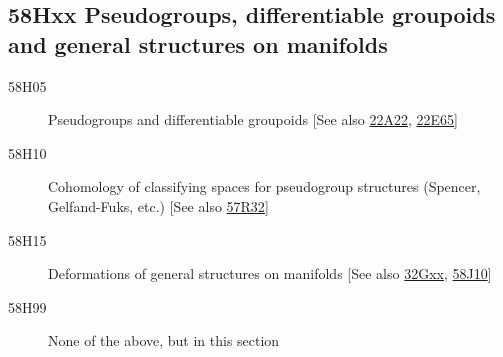 \documentclass[letterpaper]{article}
\begin{document}
\subsection*{58Hxx  Pseudogroups, differentiable groupoids and general structures on manifolds }\label{58Hxx}
\begin{description}  
\item [58H05]\label{58H05} Pseudogroups and differentiable groupoids [See also \hyperref[22A22]{22A22}, \hyperref[22E65]{22E65}]
\item [58H10]\label{58H10} Cohomology of classifying spaces for pseudogroup structures (Spencer, Gelfand-Fuks, etc.) [See also \hyperref[57R32]{57R32}]
\item [58H15]\label{58H15} Deformations of general structures on manifolds [See also \hyperref[32Gxx]{32Gxx}, \hyperref[58J10]{58J10}]
\item [58H99]\label{58H99} None of the above, but in this section
\end{description}
\end{document}
